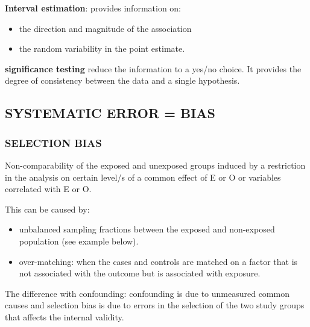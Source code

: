 \documentclass[
]{article}
\providecommand{\tightlist}{%
  \setlength{\itemsep}{0pt}\setlength{\parskip}{0pt}}
\begin{document}
\textbf{Interval estimation}: provides information on:

\begin{itemize}
\tightlist
\item
  the direction and magnitude of the association
\item
  the random variability in the point estimate.
\end{itemize}

\textbf{significance testing} reduce the information to a yes/no choice.
It provides the degree of consistency between the data and a single
hypothesis.

\hypertarget{systematic-error-bias}{%
\subsection{SYSTEMATIC ERROR = BIAS}\label{systematic-error-bias}}

\hypertarget{selection-bias}{%
\subsubsection{SELECTION BIAS}\label{selection-bias}}

Non-comparability of the exposed and unexposed groups induced by a
restriction in the analysis on certain level/s of a common effect of E
or O or variables correlated with E or O.

This can be caused by:

\begin{itemize}
\item
  unbalanced sampling fractions between the exposed and non-exposed
  population (see example below).
\item
  over-matching: when the cases and controls are matched on a factor
  that is not associated with the outcome but is associated with
  exposure.
\end{itemize}

The difference with confounding: confounding is due to unmeasured common
causes and selection bias is due to errors in the selection of the two
study groups that affects the internal validity.
\end{document}
